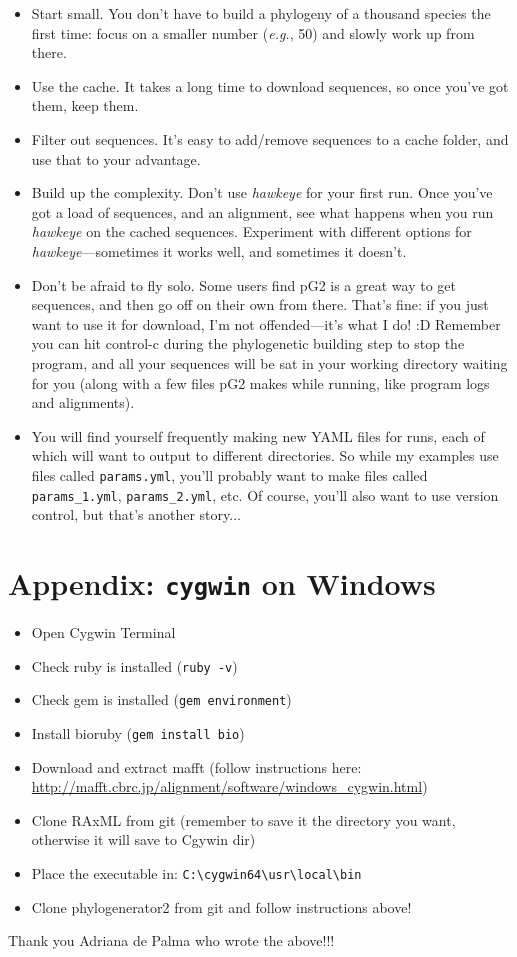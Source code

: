 \documentclass[12pt]{article}
\begin{document}
\begin{itemize}
\item Start small. You don't have to build a phylogeny of a thousand
  species the first time: focus on a smaller number (\emph{e.g.}, 50)
  and slowly work up from there.
\item Use the cache. It takes a long time to download sequences, so
  once you've got them, keep them.
\item Filter out sequences. It's easy to add/remove sequences to a
  cache folder, and use that to your advantage.
\item Build up the complexity. Don't use \emph{hawkeye} for your first
  run. Once you've got a load of sequences, and an alignment, see what
  happens when you run \emph{hawkeye} on the cached
  sequences. Experiment with different options for
  \emph{hawkeye}---sometimes it works well, and sometimes it doesn't.
\item Don't be afraid to fly solo. Some users find pG2 is a great way
  to get sequences, and then go off on their own from there. That's
  fine: if you just want to use it for download, I'm not
  offended---it's what I do! :D Remember you can hit control-c during
  the phylogenetic building step to stop the program, and all your
  sequences will be sat in your working directory waiting for you
  (along with a few files pG2 makes while running, like program logs
  and alignments).
\item You will find yourself frequently making new YAML files for
  runs, each of which will want to output to different directories. So
  while my examples use files called \texttt{params.yml}, you'll
  probably want to make files called \texttt{params\_1.yml},
  \texttt{params\_2.yml}, etc. Of course, you'll also want to use
  version control, but that's another story...
\end{itemize}

\section*{Appendix: \texttt{cygwin} on Windows}
\begin{itemize}
\item Open Cygwin Terminal
\item Check ruby is installed (\texttt{ruby -v})
\item Check gem is installed (\texttt{gem environment})
\item Install bioruby (\texttt{gem install bio})
\item Download and extract mafft (follow instructions here:
  \url{http://mafft.cbrc.jp/alignment/software/windows_cygwin.html})
\item Clone RAxML from git (remember to save it the directory you
  want, otherwise it will save to Cgywin dir)
\item Place the executable in: \texttt{C:\textbackslash cygwin64\textbackslash usr\textbackslash local\textbackslash bin}
\item Clone phylogenerator2 from git and follow instructions above!
\end{itemize}

Thank you Adriana de Palma who wrote the above!!!
\end{document}
